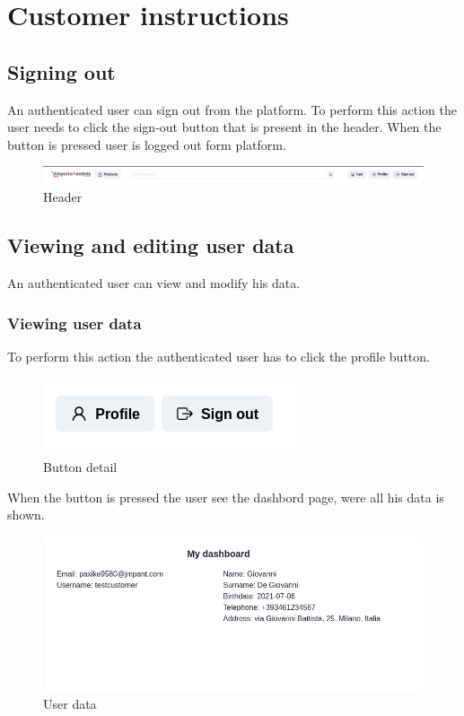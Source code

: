\section{Customer instructions}
\subsection{Signing out}
An authenticated user can sign out from the platform. To perform this action the user needs to click the sign-out button that is present in the header. When the button is pressed user is logged out form platform.
\begin{figure}[!ht]
    \caption{Header}
    \vspace{10px}
    \includegraphics[scale=0.25]{../../../../Images/userManual/signOut.jpg}
    \centering
\end{figure}
\subsection{Viewing and editing user data}
An authenticated user can view and modify his data.
\subsubsection{Viewing user data}
To perform this action the authenticated user has to click the profile button.
\begin{figure}[!ht]
    \caption{Button detail}
    \vspace{10px}
    \includegraphics[scale=0.5]{../../../../Images/userManual/profile-signoutButton.png}
    \centering
\end{figure}
When the button is pressed the user see the dashbord page, were all his data is shown.
\begin{figure}[!ht]
    \caption{User data}
    \vspace{10px}
    \includegraphics[scale=0.5]{../../../../Images/userManual/profileDshboard.png}
    \centering
\end{figure}
\newpage

